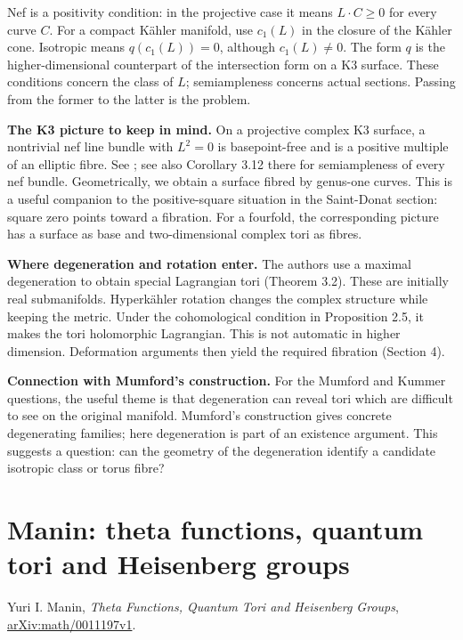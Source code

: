 Nef is a positivity condition: in the
projective case it means
$L\cdot C\geq0$ for every curve $C$.
For a compact K\"ahler manifold, use
$c_1(L)$ in the closure of the
K\"ahler cone.
Isotropic means $q(c_1(L))=0$, although
$c_1(L)\neq0$. The form $q$ is the
higher-dimensional counterpart of the
intersection form on a K3 surface.
These conditions concern the class of
$L$; semiampleness concerns actual
sections. Passing from the former to
the latter is the problem.

\medskip\noindent
{\bf The K3 picture to keep in mind.}
On a projective complex K3 surface,
a nontrivial nef line bundle with
$L^2=0$ is basepoint-free and is a
positive multiple of an elliptic fibre.
See \cite[Chapter 2, Proposition 3.10]
{huc-k3}; see also Corollary 3.12 there
for semiampleness of every nef bundle.
Geometrically, we obtain a surface
fibred by genus-one curves.
This is a useful companion to the
positive-square situation in the
Saint-Donat section: square zero
points toward a fibration.
For a fourfold, the corresponding
picture has a surface as base and
two-dimensional complex tori as fibres.

\medskip\noindent
{\bf Where degeneration and rotation enter.}
The authors use a maximal degeneration
to obtain special Lagrangian tori
(Theorem 3.2).
These are initially real submanifolds.
Hyperk\"ahler rotation changes the
complex structure while keeping the
metric. Under the cohomological
condition in Proposition 2.5, it makes
the tori holomorphic Lagrangian.
This is not automatic in higher
dimension.
Deformation arguments then yield
the required fibration
(Section 4).

\medskip\noindent
{\bf Connection with Mumford's construction.}
For the Mumford and Kummer questions,
the useful theme is that degeneration
can reveal tori which are difficult
to see on the original manifold.
Mumford's construction gives concrete
degenerating families; here degeneration
is part of an existence argument.
This suggests a question: can the
geometry of the degeneration identify
a candidate isotropic class or torus
fibre?


\section{Manin: theta functions,
quantum tori and Heisenberg groups}
\label{section-manin-quantum-tori}

\noindent
Yuri I. Manin,
\emph{Theta Functions, Quantum Tori
and Heisenberg Groups},
\href{https://arxiv.org/abs/math/0011197}
{arXiv:math/0011197v1}.

